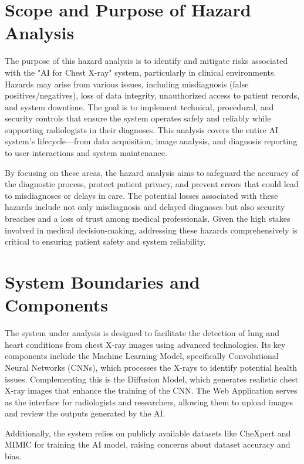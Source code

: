 \documentclass{article}
\begin{document}
\section{Scope and Purpose of Hazard Analysis}

The purpose of this hazard analysis is to identify and mitigate risks associated with the "AI for
Chest X-ray" system, particularly in clinical environments. Hazards may arise from various issues,
including misdiagnosis (false positives/negatives), loss of data integrity, unauthorized access
to patient records, and system downtime. The goal is to implement technical, procedural, and
security controls that ensure the system operates safely and reliably while supporting
radiologists in their diagnoses. This analysis covers the entire AI system's lifecycle—from data
acquisition, image analysis, and diagnosis reporting to user interactions and system maintenance.

By focusing on these areas, the hazard analysis aims to safeguard the accuracy of the diagnostic
process, protect patient privacy, and prevent errors that could lead to misdiagnoses or delays in
care. The potential losses associated with these hazards include not only misdiagnosis and delayed
diagnoses but also security breaches and a loss of trust among medical professionals. Given the
high stakes involved in medical decision-making, addressing these hazards comprehensively is
critical to ensuring patient safety and system reliability.

\section{System Boundaries and Components}

The system under analysis is designed to facilitate the detection of lung and heart conditions
from chest X-ray images using advanced technologies. Its key components include the Machine
Learning Model, specifically Convolutional Neural Networks (CNNs), which processes the X-rays to
identify potential health issues. Complementing this is the Diffusion Model, which generates
realistic chest X-ray images that enhance the training of the CNN. The Web Application serves as
the interface for radiologists and researchers, allowing them to upload images and review the
outputs generated by the AI.

Additionally, the system relies on publicly available datasets like CheXpert and MIMIC for
training the AI model, raising concerns about dataset accuracy and bias.
\end{document}
